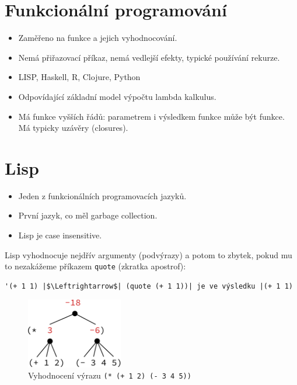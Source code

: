 \documentclass{szzclass}
\begin{document}
\section{Funkcionální programování}
\begin{itemize}
\item Zaměřeno na funkce a jejich vyhodnocování.
\item Nemá přiřazovací příkaz, nemá vedlejší efekty, typické používání rekurze.
\item LISP, Haskell, R, Clojure, Python
\item Odpovídající základní model výpočtu lambda kalkulus.
\item Má funkce vyšších řádů: parametrem i výsledkem funkce může být funkce. Má typicky uzávěry (closures).
\end{itemize}

\section{Lisp}
\begin{itemize}
\item Jeden z funkcionálních programovacích jazyků.
\item První jazyk, co měl garbage collection.
\item Lisp je case insensitive.
\end{itemize}

Lisp vyhodnocuje nejdřív argumenty (podvýrazy) a potom to zbytek, pokud mu to nezakážeme příkazem \texttt{quote} (zkratka apostrof):
\begin{verbatim}
'(+ 1 1) |$\Leftrightarrow$| (quote (+ 1 1))| je ve výsledku |(+ 1 1)
\end{verbatim}

\begin{figure}[H]
  \centering
  \includegraphics[width=4.2cm]{topics/bi-wsi-si-15/images/eval-tree}
  \caption{Vyhodnocení výrazu \texttt{(* (+ 1 2) (- 3 4 5))}}
\end{figure}
\end{document}
